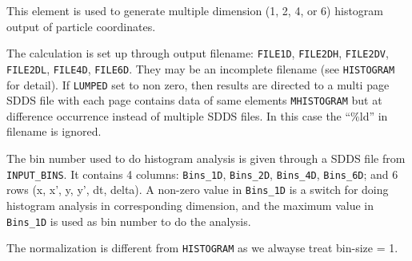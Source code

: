 This element is used to generate multiple dimension (1, 2, 4, or 6)
histogram output of particle coordinates.  

The calculation is set up through output filename: \verb|FILE1D|,
\verb|FILE2DH|, \verb|FILE2DV|, \verb|FILE2DL|, \verb|FILE4D|, \verb|FILE6D|.  
They may be an incomplete filename (see \verb|HISTOGRAM| for
detail). If \verb|LUMPED| set to non zero, then results are directed
to a multi page SDDS file with each page contains data of same
elements \verb|MHISTOGRAM| but at difference occurrence instead of
multiple SDDS files. In this case the ``\%ld'' in filename is ignored.

The bin number used to do histogram analysis is given through a SDDS
file from \verb|INPUT_BINS|. It contains 4 columns: \verb|Bins_1D|,
\verb|Bins_2D|, \verb|Bins_4D|, \verb|Bins_6D|; and 6 rows (x, x', y,
y', dt, delta). A non-zero value in \verb|Bins_1D| is a switch for
doing histogram analysis in corresponding dimension, and the maximum
value in \verb|Bins_1D| is used as bin number to do the analysis.

The normalization is different from \verb|HISTOGRAM| as we alwayse
treat bin-size = 1.
